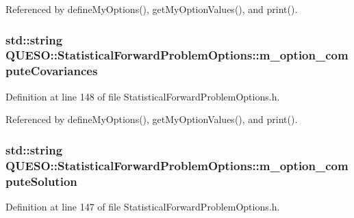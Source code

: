 Referenced by define\-My\-Options(), get\-My\-Option\-Values(), and print().

\hypertarget{class_q_u_e_s_o_1_1_statistical_forward_problem_options_ad3f809f0695c126956afd86e07f77bc4}{
\subsubsection[{m\-\_\-option\-\_\-compute\-Covariances}]{\setlength{\rightskip}{0pt plus 5cm}std\-::string Q\-U\-E\-S\-O\-::\-Statistical\-Forward\-Problem\-Options\-::m\-\_\-option\-\_\-compute\-Covariances\hspace{0.3cm}{\ttfamily [private]}}}\label{class_q_u_e_s_o_1_1_statistical_forward_problem_options_ad3f809f0695c126956afd86e07f77bc4}


Definition at line 148 of file Statistical\-Forward\-Problem\-Options.\-h.



Referenced by define\-My\-Options(), get\-My\-Option\-Values(), and print().

\hypertarget{class_q_u_e_s_o_1_1_statistical_forward_problem_options_a5e7c8a8383bb80a98ab4c271748e0d00}{
\subsubsection[{m\-\_\-option\-\_\-compute\-Solution}]{\setlength{\rightskip}{0pt plus 5cm}std\-::string Q\-U\-E\-S\-O\-::\-Statistical\-Forward\-Problem\-Options\-::m\-\_\-option\-\_\-compute\-Solution\hspace{0.3cm}{\ttfamily [private]}}}\label{class_q_u_e_s_o_1_1_statistical_forward_problem_options_a5e7c8a8383bb80a98ab4c271748e0d00}


Definition at line 147 of file Statistical\-Forward\-Problem\-Options.\-h.



